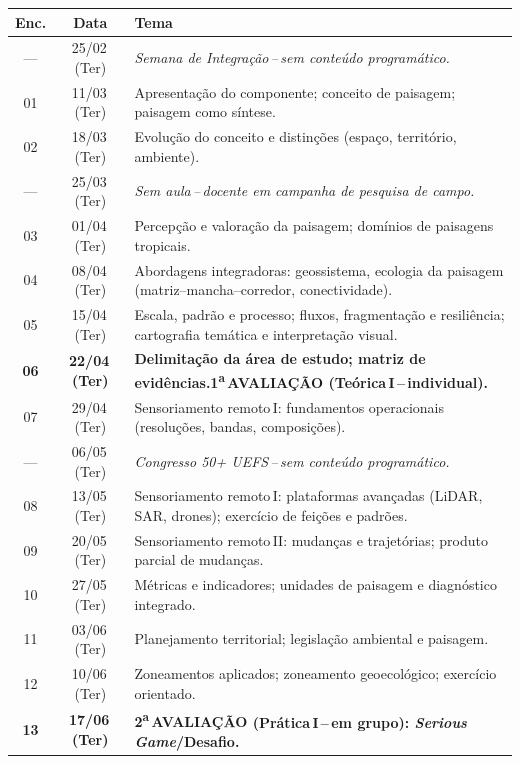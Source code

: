\documentclass[11pt,a4paper]{article}
\begin{document}
\begin{small}
\renewcommand{\arraystretch}{1.35}
\begin{tabularx}{\textwidth}{@{}c c X@{}}
\toprule
\textbf{Enc.} & \textbf{Data} & \textbf{Tema} \\
\midrule
\rowcolor{uefslight}
--- & 25/02\,(Ter) & \textit{Semana de Integração\,--\,sem conteúdo programático.} \\
01 & 11/03\,(Ter) & Apresentação do componente; conceito de paisagem; paisagem como síntese. \\
02 & 18/03\,(Ter) & Evolução do conceito e distinções (espaço, território, ambiente). \\
\rowcolor{uefslight}
--- & 25/03\,(Ter) & \textit{Sem aula\,--\,docente em campanha de pesquisa de campo.} \\
03 & 01/04\,(Ter) & Percepção e valoração da paisagem; domínios de paisagens tropicais. \\
04 & 08/04\,(Ter) & Abordagens integradoras: geossistema, ecologia da paisagem (matriz--mancha--corredor, conectividade). \\
05 & 15/04\,(Ter) & Escala, padrão e processo; fluxos, fragmentação e resiliência; cartografia temática e interpretação visual. \\
\rowcolor{uefslight!70!white}
\textbf{06} & \textbf{22/04\,(Ter)} & \textbf{Delimitação da área de estudo; matriz de evidências.\enspace\textsf{1\textsuperscript{a}\,AVALIAÇÃO} (Teórica\,I\,--\,individual).} \\
07 & 29/04\,(Ter) & Sensoriamento remoto\,I: fundamentos operacionais (resoluções, bandas, composições). \\
\rowcolor{uefslight}
--- & 06/05\,(Ter) & \textit{Congresso 50+ UEFS\,--\,sem conteúdo programático.} \\
08 & 13/05\,(Ter) & Sensoriamento remoto\,I: plataformas avançadas (LiDAR, SAR, drones); exercício de feições e padrões. \\
09 & 20/05\,(Ter) & Sensoriamento remoto\,II: mudanças e trajetórias; produto parcial de mudanças. \\
10 & 27/05\,(Ter) & Métricas e indicadores; unidades de paisagem e diagnóstico integrado. \\
11 & 03/06\,(Ter) & Planejamento territorial; legislação ambiental e paisagem. \\
12 & 10/06\,(Ter) & Zoneamentos aplicados; zoneamento geoecológico; exercício orientado. \\
\rowcolor{uefslight!70!white}
\textbf{13} & \textbf{17/06\,(Ter)} & \textbf{\textsf{2\textsuperscript{a}\,AVALIAÇÃO} (Prática\,I\,--\,em grupo): \textit{Serious Game}/Desafio.} \\

\end{tabularx}
\end{small}
\end{document}
